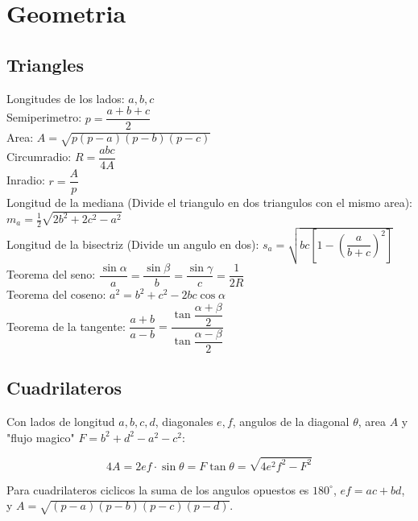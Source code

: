 \section{Geometria}

\subsection{Triangles}
Longitudes de los lados: $a,b,c$\\
Semiperimetro: $p=\dfrac{a+b+c}{2}$\\
Area: $A=\sqrt{p(p-a)(p-b)(p-c)}$\\
Circumradio: $R=\dfrac{abc}{4A}$\\
Inradio: $r=\dfrac{A}{p}$\\
Longitud de la mediana (Divide el triangulo en dos triangulos con el mismo area): $m_a=\tfrac{1}{2}\sqrt{2b^2+2c^2-a^2}$\\
Longitud de la bisectriz (Divide un angulo en dos): $s_a=\sqrt{bc\left[1-\left(\dfrac{a}{b+c}\right)^2\right]}$\\
Teorema del seno: $\dfrac{\sin\alpha}{a}=\dfrac{\sin\beta}{b}=\dfrac{\sin\gamma}{c}=\dfrac{1}{2R}$\\
Teorema del coseno: $a^2=b^2+c^2-2bc\cos\alpha$\\
Teorema de la tangente: $\dfrac{a+b}{a-b}=\dfrac{\tan\dfrac{\alpha+\beta}{2}}{\tan\dfrac{\alpha-\beta}{2}}$\\

\subsection{Cuadrilateros}
Con lados de longitud $a,b,c,d$, diagonales $e, f$, angulos de la diagonal $\theta$, area $A$ y "flujo magico" $F=b^2+d^2-a^2-c^2$:

\[ 4A = 2ef \cdot \sin\theta = F\tan\theta = \sqrt{4e^2f^2-F^2} \]

Para cuadrilateros ciclicos la suma de los angulos opuestos es $180^\circ$,
$ef = ac + bd$, y $A = \sqrt{(p-a)(p-b)(p-c)(p-d)}$.


